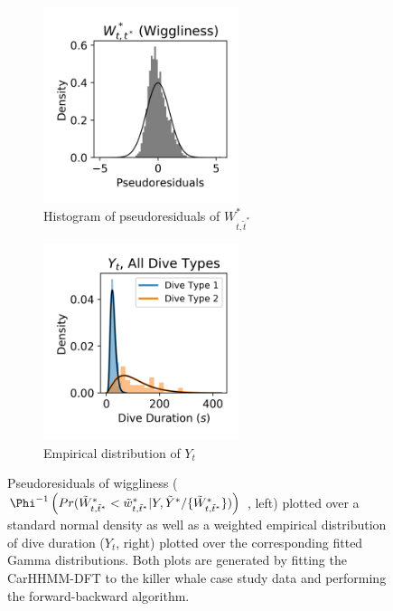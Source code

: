 \begin{figure}[ht]
    \begin{subfigure}{0.45\textwidth}
    	\centering
    	\includegraphics[width=2.25in]{../Plots/CarHHMM2_psedoresids_ahat.png}
    	\caption{Histogram of pseudoresiduals of $W^*_{t,\tilde t^*}$}
    	\label{fig:pseudoresids}
    \end{subfigure}
    \begin{subfigure}{0.45\textwidth}
    	\centering
    	\includegraphics[width=2.25in]{../Plots/CarHHMM2_empirical_hist_dive_duration.png}
    	\caption{Empirical distribution of $Y_t$}
    	\label{fig:empirical_dist}
    \end{subfigure}
    \caption{Pseudoresiduals of wiggliness ($\Phi^{-1} \left(Pr(\Ztwo_{t,\tilde t^*} < \ztwo_{t,\tilde t^*}|Y,\tilde Y^* / \{\Ztwo_{t,\tilde t^*}\}) \right)$ , left) plotted over a standard normal density as well as a weighted empirical distribution of dive duration ($Y_t$, right) plotted over the corresponding fitted Gamma distributions. Both plots are generated by fitting the CarHHMM-DFT to the killer whale case study data and performing the forward-backward algorithm.}
    \label{fig:model_checking}
\end{figure}


